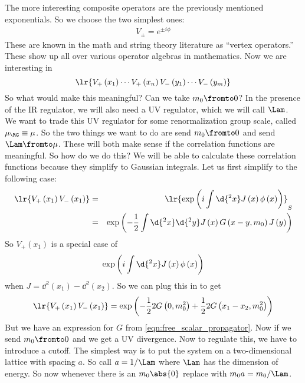 \documentclass{booc}
\begin{document}
The more interesting composite operators are the previously mentioned exponentials. 
So we choose the two simplest ones:
\begin{eqnarray}
V_{\pm} = e^{\pm i\phi}
\end{eqnarray}
These are known in the math and string theory literature as
``vertex operators.''
These show up all over various operator algebras in mathematics.
Now we are interesting in 
\begin{equation}
\lr{
V_+\left( x_1 \right)
\cdots
V_+\left( x_n \right)
V_-\left( y_1 \right)
\cdots
V_-\left( y_m \right)
}
\end{equation}
So what would make this meaningful?
Can we take $m_0 \fromto 0$?
In the presence of the IR regulator, we will also need a UV regulator, 
which we will call $\Lam$. 
We want to trade this UV regulator for some renormalization group scale, called 
$\mu_\RG \equiv \mu$.
So the two things we want to do are send $m_0\fromto 0$ and send
$\Lam \fromto \mu$.
These will both make sense if the correlation functions are meaningful. 
So how do we do this?
We will be able to calculate these correlation functions because they simplify to Gaussian integrals. 
Let us first simplify to the following case:
\begin{eqnarray}
\lr{V_+\left( x_1 \right)V_-\left( x_1 \right)} &=& 
\lr{
\exp\left( i\int \d{^2 x} J\left( x \right) \phi\left( x \right) \right)
}_S
\\&=&  \exp\left( 
-\frac{1}{2}
\int \d{^2 x}\d{^2 y}
J\left( x \right) G\left( x - y , m_0 \right) J\left( y \right)
\right)
\end{eqnarray}
So $V_+\left( x_1 \right)$ 
is a special case of 
\begin{equation}
\exp\left( i\int \d{^2 x} J\left( x \right) \phi\left( x \right) \right)
\end{equation}
when $J = \dd^2\left( x_1 \right) - \dd^2\left( x_2 \right)$.
So we can plug this in to get
\begin{equation}
\lr{V_+\left( x_1 \right)V_-\left( x_1 \right)}=
\exp\left( 
-\frac{1}{2} 2G\left( 0, m_0^2 \right)
+ \frac{1}{2} 2 G\left( x_1 - x_2 , m_0^2 \right)
\right)
\end{equation}
But we have an expression for $G$ from
\eqref{eqn:free_scalar_propagator}.
Now if we send $m_0\fromto 0$
and we get a UV divergence. Now to regulate this, we have to introduce a cutoff. 
The simplest way is to put the system on a two-dimensional lattice with spacing $a$. 
So call $a = 1/ \Lam$ where $\Lam$ has the dimension of energy. 
So now whenever there is an $m_0 \abs{0}$ replace with $m_0 a = m_0 / \Lam$. 
\end{document}
